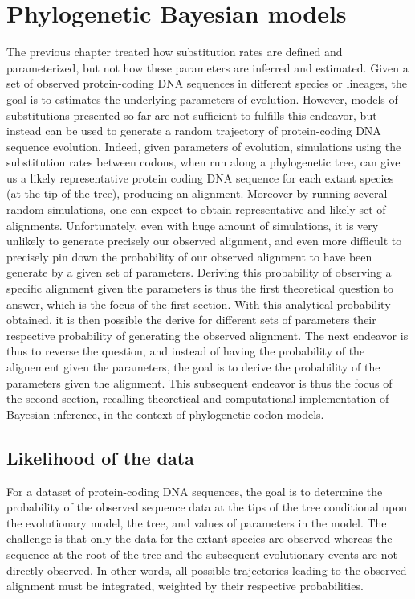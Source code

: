 \chapter{Phylogenetic Bayesian models}
{
	\hypersetup{linkcolor=GREYDARK}
	\minitoc
}
\label{sec:phylo_bayes}
The previous chapter treated how \gls{substitution} rates are defined and parameterized, but not how these parameters are inferred and estimated.
Given a set of observed protein-coding \acrshort{DNA} sequences in different species or lineages, the goal is to estimates the underlying parameters of evolution.
However, models of \glspl{substitution} presented so far are not sufficient to fulfills this endeavor, but instead can be used to generate a random trajectory of protein-coding \acrshort{DNA} sequence evolution.
Indeed, given parameters of evolution, simulations using the \gls{substitution} rates between \glspl{codon}, when run along a phylogenetic tree, can give us a likely representative protein coding \acrshort{DNA} sequence for each extant species (at the tip of the tree), producing an alignment. 
Moreover by running several random simulations, one can expect to obtain representative and likely set of alignments.
Unfortunately, even with huge amount of simulations, it is very unlikely to generate precisely our observed alignment, and even more difficult to precisely pin down the probability of our observed alignment to have been generate by a given set of parameters.
Deriving this probability of observing a specific alignment given the parameters is thus the first theoretical question to answer, which is the focus of the first section.
With this analytical probability obtained, it is then possible the derive for different sets of parameters their respective probability of generating the observed alignment.
The next endeavor is thus to reverse the question, and instead of having the probability of the alignement given the parameters, the goal is to derive the probability of the parameters given the alignment.
This subsequent endeavor is thus the focus of the second section, recalling theoretical and computational implementation of Bayesian inference, in the context of phylogenetic \gls{codon} models.

\section{Likelihood of the data}

For a dataset of protein-coding \acrshort{DNA} sequences, the goal is to determine the probability of the observed sequence data at the tips of the tree conditional upon the evolutionary model, the tree, and values of parameters in the model.
The challenge is that only the data for the extant species are observed whereas the sequence at the root of the tree and the subsequent evolutionary events are not directly observed.
In other words, all possible trajectories leading to the observed alignment must be integrated, weighted by their respective probabilities.

